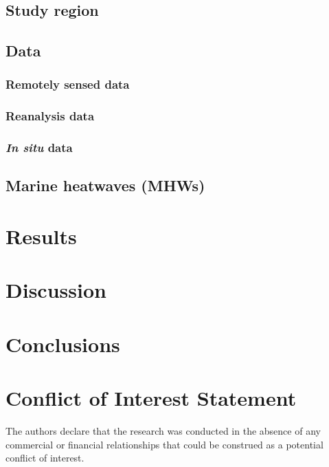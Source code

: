 \documentclass[utf8]{frontiersSCNS}
\begin{document}
\subsection{Study region}


\subsection{Data}


\subsubsection{Remotely sensed data}


\subsubsection{Reanalysis data}


\subsubsection{\emph{In situ} data}


\subsection{Marine heatwaves (MHWs)}


\section{Results}


\section{Discussion}


\section{Conclusions}


\section*{Conflict of Interest Statement}
The authors declare that the research was conducted in the absence of any commercial or financial relationships that could be construed as a potential conflict of interest.
\end{document}
